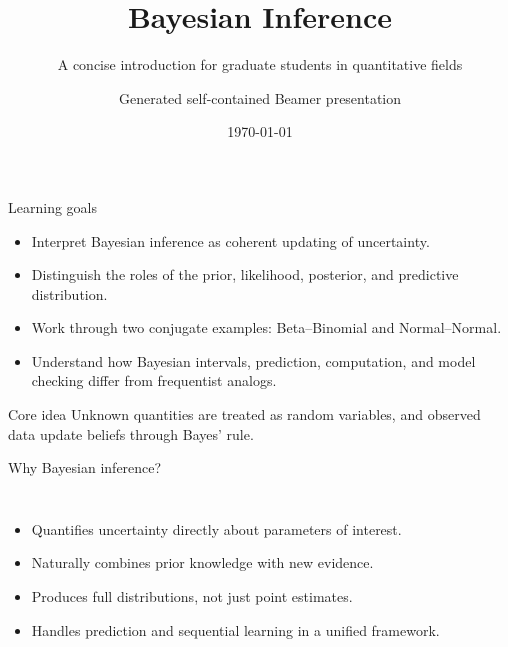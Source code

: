 \documentclass[aspectratio=169]{beamer}
\title{Bayesian Inference}
\subtitle{A concise introduction for graduate students in quantitative fields}
\author{Generated self-contained Beamer presentation}
\date{\today}
\begin{document}
\begin{frame}
  \titlepage
\end{frame}

\begin{frame}{Learning goals}
\begin{itemize}
  \item Interpret Bayesian inference as coherent updating of uncertainty.
  \item Distinguish the roles of the prior, likelihood, posterior, and predictive distribution.
  \item Work through two conjugate examples: Beta--Binomial and Normal--Normal.
  \item Understand how Bayesian intervals, prediction, computation, and model checking differ from frequentist analogs.
\end{itemize}
\vspace{0.5em}
\begin{block}{Core idea}
Unknown quantities are treated as random variables, and observed data update beliefs through Bayes' rule.
\end{block}
\end{frame}

\begin{frame}{Why Bayesian inference?}
\begin{columns}[T,onlytextwidth]
\begin{itemize}
  \item Quantifies uncertainty directly about parameters of interest.
  \item Naturally combines prior knowledge with new evidence.
  \item Produces full distributions, not just point estimates.
  \item Handles prediction and sequential learning in a unified framework.
\end{itemize}

\centering
{}
\end{columns}
\end{frame}
\end{document}
